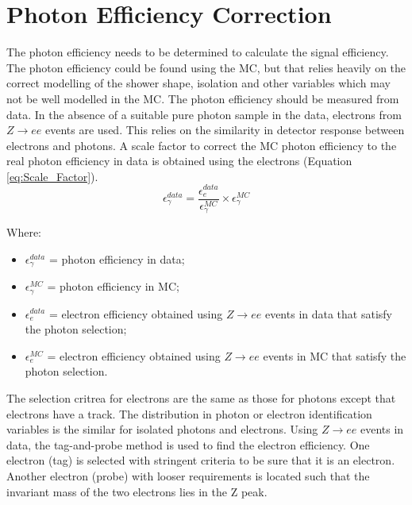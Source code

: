 \section{Photon Efficiency Correction}
\label{sec:phoeff}

The photon efficiency needs to be determined to calculate the signal efficiency.
The photon efficiency could be found using the MC, but that relies heavily on
the correct modelling of the shower shape, isolation and other variables which
may not be well modelled in the MC. The photon efficiency should be measured
from data. In the absence of a suitable pure photon sample in the data, 
electrons from $Z\rightarrow ee$ events are used. This relies on the similarity 
in detector response between electrons and photons. A scale factor to correct 
the MC photon efficiency to the real photon efficiency in data is obtained using 
the electrons (Equation \ref{eq:Scale_Factor}). \\

\begin{equation}
\epsilon_{\gamma}^{data} = \frac{\epsilon_{e}^{data}}{\epsilon_{\gamma}^{MC}}
\times \epsilon_{\gamma}^{MC}
\label{eq:Scale_Factor}
\end{equation}  

Where:
\begin{itemize}
\item $\epsilon_{\gamma}^{data}$ = photon efficiency in data;
\item $\epsilon_{\gamma}^{MC}$ = photon efficiency in MC;
\item $\epsilon_{e}^{data}$ = electron efficiency obtained using $Z\rightarrow
ee$ events in data that satisfy the photon selection; 
\item $\epsilon_{e}^{MC}$ = electron efficiency obtained using $Z\rightarrow ee$
events in MC that satisfy the photon selection. 
\end{itemize}

The selection critrea for electrons are the same as those for photons except 
that electrons have a track. The distribution in photon or electron 
identification variables is the similar for isolated photons and electrons. 
Using $Z\rightarrow ee$ events in data, the tag-and-probe method is used to find
the electron efficiency. One electron (tag) is selected with stringent criteria 
to be sure that it is an electron. Another electron (probe) with looser 
requirements is located such that the invariant mass of the two electrons lies 
in the Z peak. \\

